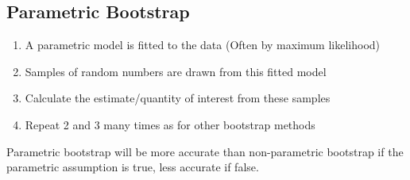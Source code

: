 \documentclass[10pt,landscape, fleqn]{article}
\begin{document}
\begin{multicols}{3}
			\subsection{Parametric Bootstrap}
				\begin{enumerate}
					\item A parametric model is fitted to the data (Often by maximum likelihood)
					\item Samples of random numbers are drawn from this fitted model
					\item Calculate the estimate/quantity of interest from these samples
					\item Repeat 2 and 3 many times as for other bootstrap methods
				\end{enumerate}
				Parametric bootstrap will be more accurate than non-parametric bootstrap if the parametric assumption is true, less accurate if false.

\end{multicols}
\end{document}
